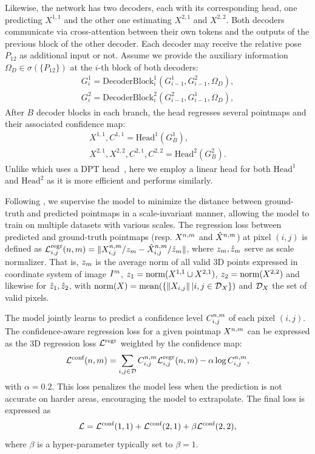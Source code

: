 Likewise, the network has two decoders, each with its corresponding head, one predicting $X^{1,1}$ and the other one estimating $X^{2,1}$ and $X^{2,2}$. 
Both decoders communicate via cross-attention between their own tokens and the outputs of the previous block of the other decoder. 
Each decoder may receive the relative pose $P_{12}$ as additional input or not. 
Assume we provide the auxiliary information $\Omega_D \in \sigma(\{P_{12}\})$ at the $i$-th block of both decoders:
\begin{eqnarray}
  G_i^1 = \text{DecoderBlock}^1_{i}\left(G_{i-1}^1, G_{i-1}^2, \Omega_D\right), \nonumber \\
  G_i^2 = \text{DecoderBlock}^2_{i}\left(G_{i-1}^2, G_{i-1}^1, \Omega_D\right),
\end{eqnarray}
After $B$ decoder blocks in each branch,
the head regresses several pointmaps and their associated confidence map:
\begin{eqnarray}
  X^{1,1}, C^{1,1} = \text{Head}^1\left(G_B^1\right), \nonumber \\
  X^{2,1}, X^{2,2}, C^{2,1}, C^{2,2} = \text{Head}^2\left(G_B^2\right).
\end{eqnarray}
Unlike \duster{} which uses a DPT head~\cite{dpt}, here we employ a linear head for both $\text{Head}^1$ and $\text{Head}^2$ %
as it is more efficient and performs similarly.


Following \duster{}, we supervise the model to minimize the distance between ground-truth and predicted pointmaps in a scale-invariant manner, allowing the model to train on multiple datasets with various scales.
The regression loss between predicted and ground-truth pointmaps (resp. $X^{n,m}$ and $\hat{X}^{n,m}$) at pixel $(i,j)$ is defined as $\mathcal{L}^{\text{regr}}_{i,j}(n,m)=\Vert X^{n,m}_{i,j}/z_m  - \hat{X}^{n,m}_{i,j}/\hat{z}_m \Vert$, where $z_m,\hat{z}_m$ serve as scale normalizer.
That is, $z_m$ is the average norm of all valid 3D points expressed in coordinate system of image $I^{m}$, \ie  $z_1=\text{norm}(X^{1,1} \cup X^{2,1})$,  $z_2=\text{norm}(X^{2,2})$ and likewise for $\hat{z}_1,\hat{z}_2$, with $\text{norm}(X)=\text{mean}(\{\Vert X_{i,j} \Vert\, | i,j \in \mathcal{D}_X\})$ and $\mathcal{D}_X$ the set of valid pixels. 

The model jointly learns to predict a confidence level $C^{n,m}_{i,j}$ of each pixel $(i,j)$.
The confidence-aware regression loss for a given pointmap $X^{n,m}$ can be expressed as the 3D regression loss $\mathcal{L}^{\text{regr}}$ weighted by the confidence map:
\begin{equation}
  \mathcal{L}^{\text{conf}}(n,m) = \sum_{i,j\in\mathcal{D}} C^{n,m}_{i,j} \mathcal{L}^{\text{regr}}_{i,j}(n,m) - \alpha \log C^{n,m}_{i,j},
\label{eq:conf_loss}
\end{equation}
with $\alpha=0.2$. This loss penalizes the model less when the prediction is not accurate on harder areas, encouraging the model to extrapolate.
The final loss is expressed as
\begin{equation}
  \mathcal{L} = \mathcal{L}^{\text{conf}}(1,1) + \mathcal{L}^{\text{conf}}(2,1) + \beta \mathcal{L}^{\text{conf}}(2,2),
\end{equation}
where $\beta$ is a hyper-parameter typically set to $\beta=1$. 

